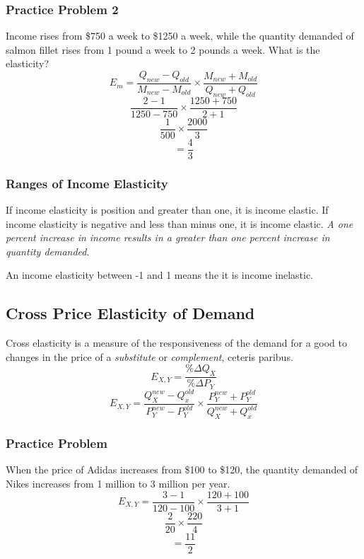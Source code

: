\documentclass{article}
\begin{document}
\subsubsection{Practice Problem 2}
Income rises from \$750 a week to \$1250 a week, while the quantity demanded of
salmon fillet rises from 1 pound a week to 2 pounds a week. What is the
elasticity?
\[ E_{m} = \frac{Q_{new}-Q_{old}}{M_{new}-M_{old}}\times
           \frac{M_{new}+M_{old}}{Q_{new}+Q_{old}} \]
\[ \frac{2-1}{1250-750}\times\frac{1250+750}{2+1} \]
\[ \frac{1}{500}\times\frac{2000}{3} \]
\[ = \frac{4}{3} \]

\subsubsection{Ranges of Income Elasticity}
If income elasticity is position and greater than one, it is income elastic.
If income elasticity is negative and less than minus one, it is income elastic.
\textit{A one percent increase in income results in a greater than one percent
increase in quantity demanded}. \par
An income elasticity between -1 and 1 means the it is income inelastic.

\subsection{Cross Price Elasticity of Demand}
Cross elasticity is a measure of the responsiveness of the demand for a good
to changes in the price of a \textit{substitute} or \textit{complement},
ceteris paribus.
\[ E_{X,Y} = \frac{\%\Delta Q_{X}}{\%\Delta P_{Y}} \]
\[ E_{X,Y} = \frac{Q_{X}^{new}-Q_{x}^{old}}{P_{Y}^{new}-P_{Y}^{old}}\times
             \frac{P_{Y}^{new}+P_{Y}^{old}}{Q_{X}^{new}+Q_{x}^{old}} \]

\subsubsection{Practice Problem}
When the price of Adidas increases from \$100 to \$120, the quantity demanded
of Nikes increases from 1 million to 3 million per year.
\[ E_{X,Y} = \frac{3-1}{120-100}\times\frac{120+100}{3+1} \]
\[ \frac{2}{20}\times\frac{220}{4} \]
\[ = \frac{11}{2} \]
\end{document}
